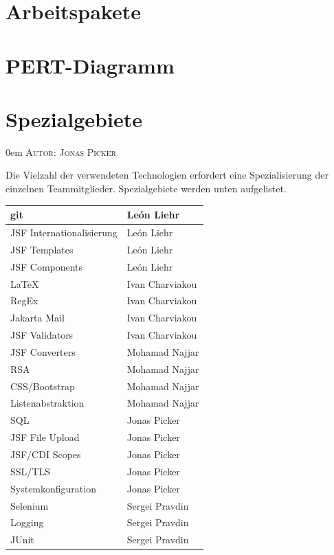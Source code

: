 \documentclass{article}
\makeatletter
\newcommand{\sectionauthor}[1]{
	{\parindent 0em \large \scshape Autor: #1 \par \nobreak \vspace*{1em}}
	\@afterheading
}
\makeatother
\begin{document}
\section{Arbeitspakete}


\section{PERT-Diagramm}


\section{Spezialgebiete}
\sectionauthor{Jonas Picker}
Die Vielzahl der verwendeten Technologien erfordert eine Spezialisierung der einzelnen Teammitglieder. Spezialgebiete werden unten aufgelistet.
\begin{table}[H]
\centering
\begin{tabular}{| p{6cm} | p{6cm} |}
	\hline
     	git & León Liehr \\
     	\hline
     	JSF Internationalisierung & León Liehr \\
     	\hline
    	JSF Templates & León Liehr \\	
     	\hline
     	JSF Components & León Liehr \\
     	\hline
     	\hline
     	LaTeX & Ivan Charviakou \\
     	\hline
     	RegEx & Ivan Charviakou \\
     	\hline
     	Jakarta Mail & Ivan Charviakou \\
     	\hline
     	JSF Validators & Ivan Charviakou \\
     	\hline
     	\hline
     	JSF Converters & Mohamad Najjar \\
    	\hline
    	 RSA & Mohamad Najjar \\
    	\hline
    	 CSS/Bootstrap & Mohamad Najjar \\
     	\hline
     	Listenabstraktion & Mohamad Najjar \\
     	\hline
     	\hline
     	SQL & Jonas Picker \\
    	\hline
    	JSF File Upload & Jonas Picker \\
     	\hline
     	JSF/CDI Scopes & Jonas Picker \\
     	\hline
     	SSL/TLS & Jonas Picker \\
     	\hline
     	Systemkonfiguration & Jonas Picker \\
     	\hline
     	\hline
     	Selenium & Sergei Pravdin \\
     	\hline
     	Logging & Sergei Pravdin \\
     	\hline
     	JUnit & Sergei Pravdin \\
     	\hline
\end{tabular}
\end{table}
\end{document}
